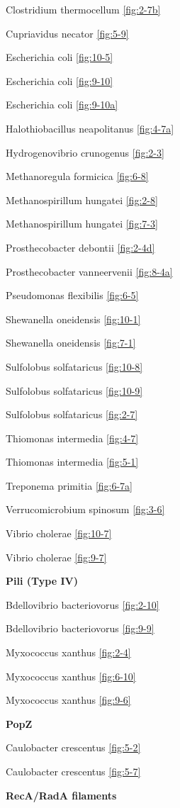 \documentclass[]{tufte-book}
\begin{document}
Clostridium thermocellum \ref{fig:2-7b}

Cupriavidus necator \ref{fig:5-9}

Escherichia coli \ref{fig:10-5}

Escherichia coli \ref{fig:9-10}

Escherichia coli \ref{fig:9-10a}

Halothiobacillus neapolitanus \ref{fig:4-7a}

Hydrogenovibrio crunogenus \ref{fig:2-3}

Methanoregula formicica \ref{fig:6-8}

Methanospirillum hungatei \ref{fig:2-8}

Methanospirillum hungatei \ref{fig:7-3}

Prosthecobacter debontii \ref{fig:2-4d}

Prosthecobacter vanneervenii \ref{fig:8-4a}

Pseudomonas flexibilis \ref{fig:6-5}

Shewanella oneidensis \ref{fig:10-1}

Shewanella oneidensis \ref{fig:7-1}

Sulfolobus solfataricus \ref{fig:10-8}

Sulfolobus solfataricus \ref{fig:10-9}

Sulfolobus solfataricus \ref{fig:2-7}

Thiomonas intermedia \ref{fig:4-7}

Thiomonas intermedia \ref{fig:5-1}

Treponema primitia \ref{fig:6-7a}

Verrucomicrobium spinosum \ref{fig:3-6}

Vibrio cholerae \ref{fig:10-7}

Vibrio cholerae \ref{fig:9-7}

\textbf{Pili (Type IV)}

Bdellovibrio bacteriovorus \ref{fig:2-10}

Bdellovibrio bacteriovorus \ref{fig:9-9}

Myxococcus xanthus \ref{fig:2-4}

Myxococcus xanthus \ref{fig:6-10}

Myxococcus xanthus \ref{fig:9-6}

\textbf{PopZ}

Caulobacter crescentus \ref{fig:5-2}

Caulobacter crescentus \ref{fig:5-7}

\textbf{RecA/RadA filaments}
\end{document}
